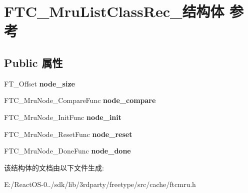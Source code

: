 \hypertarget{struct_f_t_c___mru_list_class_rec__}{}\section{F\+T\+C\+\_\+\+Mru\+List\+Class\+Rec\+\_\+结构体 参考}
\label{struct_f_t_c___mru_list_class_rec__}
\subsection*{Public 属性}
\begin{DoxyCompactItemize}
\item 
\mbox{\label{struct_f_t_c___mru_list_class_rec___ad2fbb0154f56c762aedd3993ec70b3f8}} 
F\+T\+\_\+\+Offset {\bfseries node\+\_\+size}
\item 
\mbox{\label{struct_f_t_c___mru_list_class_rec___ac6e2ce3551a013d0265673ba113ad62a}} 
F\+T\+C\+\_\+\+Mru\+Node\+\_\+\+Compare\+Func {\bfseries node\+\_\+compare}
\item 
\mbox{\label{struct_f_t_c___mru_list_class_rec___a167b0882d1c55f78f35059e150212d82}} 
F\+T\+C\+\_\+\+Mru\+Node\+\_\+\+Init\+Func {\bfseries node\+\_\+init}
\item 
\mbox{\label{struct_f_t_c___mru_list_class_rec___ab4a9d2bb62f972f72f72755c32652c8c}} 
F\+T\+C\+\_\+\+Mru\+Node\+\_\+\+Reset\+Func {\bfseries node\+\_\+reset}
\item 
\mbox{\label{struct_f_t_c___mru_list_class_rec___a85482f5a96f6e7ecb28dfbe03873c9ea}} 
F\+T\+C\+\_\+\+Mru\+Node\+\_\+\+Done\+Func {\bfseries node\+\_\+done}
\end{DoxyCompactItemize}


该结构体的文档由以下文件生成\+:\begin{DoxyCompactItemize}
\item 
E\+:/\+React\+O\+S-\/0../sdk/lib/3rdparty/freetype/src/cache/ftcmru.\+h\end{DoxyCompactItemize}
